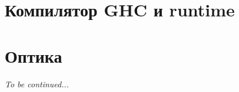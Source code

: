 \documentclass[12pt]{article}
\begin{document}


    \section{Компилятор GHC и runtime}




    \section{Оптика}












    \begin{center}
        \vspace{2em}
        \textit{\LARGE To be continued...}
        \vspace{2em}
    \end{center}


    \newpage
    
\end{document}
